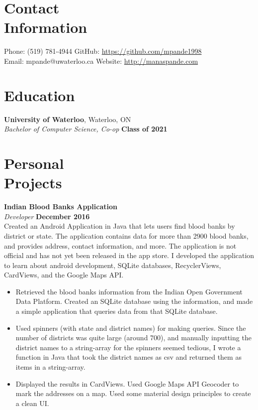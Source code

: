 \documentclass[margin,line]{resume}
\begin{document}
\begin{resume}
    \section{\mysidestyle Contact\\Information}

    Phone: (519) 781-4944       \hfill GitHub: \url{https://github.com/mpande1998} \\
    \noindent Email: mpande@uwaterloo.ca  \hfill Website: \url{http://manaspande.com} \vspace{0mm}\\\vspace{-4.5mm}

    \section{\mysidestyle Education}

    \textbf{University of Waterloo}, Waterloo, ON \vspace{2mm}\\\vspace{1mm}%
    \textsl{Bachelor of Computer Science, Co-op} \hfill \textbf{Class of 2021}

    \section{\mysidestyle Personal\\Projects}

    \textbf{Indian Blood Banks Application}\vspace{2mm}\\\vspace{1mm}%
    \textsl{Developer} \hfill \textbf{December 2016}\\
    Created an Android Application in Java that lets users find blood banks by district or state. The application contains data for more than 2900 blood banks, and provides address, contact information, and more. The application is not official and has not yet been released in the app store. I developed the application to learn about android development, SQLite databases, RecyclerViews, CardViews, and the Google Maps API.

    \begin{itemize}
    \item Retrieved the blood banks information from the Indian Open Government Data Platform. Created an SQLite database using the information, and made a simple application that queries data from that SQLite database.
    \item Used spinners (with state and district names) for making queries. Since the number of districts was quite large (around 700), and manually inputting the district names to a string-array for the spinners seemed tedious, I wrote a function in Java that took the district names as csv and returned them as items in a string-array.
    \item Displayed the results in CardViews. Used Google Maps API Geocoder to mark the addresses on a map. Used some material design principles to create a clean UI.
    \end{itemize}


\end{resume}
\end{document}
